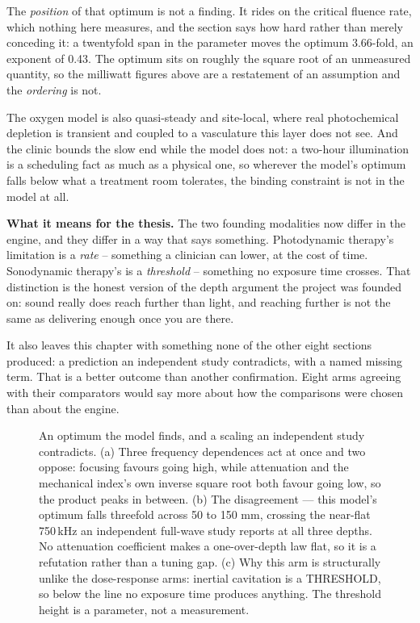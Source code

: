 \documentclass[11pt,twoside,openright]{report}
\begin{document}
\begin{refusal}
The \textit{position} of that optimum is not a finding. It rides on the critical fluence rate, which nothing here measures, and the section says how hard rather than merely conceding it: a twentyfold span in the parameter moves the optimum 3.66-fold, an exponent of 0.43. The optimum sits on roughly the square root of an unmeasured quantity, so the milliwatt figures above are a restatement of an assumption and the \textit{ordering} is not.

The oxygen model is also quasi-steady and site-local, where real photochemical depletion is transient and coupled to a vasculature this layer does not see. And the clinic bounds the slow end while the model does not: a two-hour illumination is a scheduling fact as much as a physical one, so wherever the model's optimum falls below what a treatment room tolerates, the binding constraint is not in the model at all.
\end{refusal}

\textbf{What it means for the thesis.} The two founding modalities now differ in the engine, and they differ in a way that says something. Photodynamic therapy's limitation is a \textit{rate} -- something a clinician can lower, at the cost of time. Sonodynamic therapy's is a \textit{threshold} -- something no exposure time crosses. That distinction is the honest version of the depth argument the project was founded on: sound really does reach further than light, and reaching further is not the same as delivering enough once you are there.

It also leaves this chapter with something none of the other eight sections produced: a prediction an independent study contradicts, with a named missing term. That is a better outcome than another confirmation. Eight arms agreeing with their comparators would say more about how the comparisons were chosen than about the engine.

\begin{figure}[tbp]
\setcounter{figure}{38}
\caption{An optimum the model finds, and a scaling an independent study contradicts. (a) Three frequency dependences act at once and two oppose: focusing favours going high, while attenuation and the mechanical index's own inverse square root both favour going low, so the product peaks in between. (b) The disagreement --- this model's optimum falls threefold across 50 to 150 mm, crossing the near-flat 750\,kHz an independent full-wave study reports at all three depths. No attenuation coefficient makes a one-over-depth law flat, so it is a refutation rather than a tuning gap. (c) Why this arm is structurally unlike the dose-response arms: inertial cavitation is a THRESHOLD, so below the line no exposure time produces anything. The threshold height is a parameter, not a measurement.}
\label{fig:fig43_sonodynamic_frequency}
\end{figure}
\end{document}
